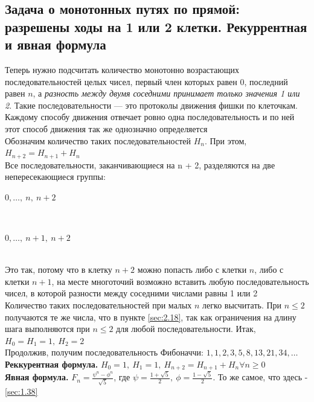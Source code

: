 \documentclass[a4paper]{article}
\begin{document}
\subsection{Задача о монотонных путях по прямой: разрешены ходы на 1 или 2 клетки. Рекуррентная и явная формула}
Теперь нужно подсчитать количество монотонно возрастающих последовательностей целых чисел, первый член которых равен 0, последний равен $n$, а \textit{разность между двумя соседними принимает только значения 1 или 2}. Такие последовательности — это протоколы движения фишки по клеточкам. Каждому способу движения отвечает ровно одна последовательность и по ней этот способ движения так же однозначно определяется\\[2mm]
\indent Обозначим количество таких последовательностей $H_n$. При этом, $H_{n+2}=H_{n+1}+H_n$\\[2mm]
\indent Все последовательности, заканчивающиеся на n + 2, разделяются на две непересекающиеся группы:\\[2mm]
\centerline{$0,\ldots,\ n,\ n+2$}\\[2mm]
\centerline{$0,\ldots,\ n+1,\ n+2$}\\[2mm]
\indent Это так, потому что в клетку $n+2$ можно попасть либо с клетки $n$, либо с клетки $n+1$, на месте многоточий возможно вставить любую последовательность чисел, в которой разности между соседними числами равны 1 или 2\\[2mm]
\indent Количество таких последовательностей при малых $n$ легко высчитать. При $n\leqslant2$ получаются те же числа, что в пункте \ref{sec:2.18}, так как ограничения на длину шага выполняются при $n\leqslant2$ для любой последовательности. Итак, $H_0=H_1=1,\ H_2=2$\\[2mm]
\indent Продолжив, получим последовательность Фибоначчи: $1, 1, 2, 3, 5, 8, 13, 21, 34,\ldots$\\[2mm]
\textbf{Реккурентная формула.} $H_0=1,\ H_1=1,\ H_{n+2}=H_{n+1}+H_n\forall n\geqslant0$\\[2mm]
\textbf{Явная формула.} $F_n=\frac{\psi^n-\phi^n}{\sqrt{5}}$, где $\psi=\frac{1+\sqrt{5}}{2},\ \phi=\frac{1-\sqrt{5}}{2}$. То же самое, что здесь - \ref{sec:1.38}
\end{document}
